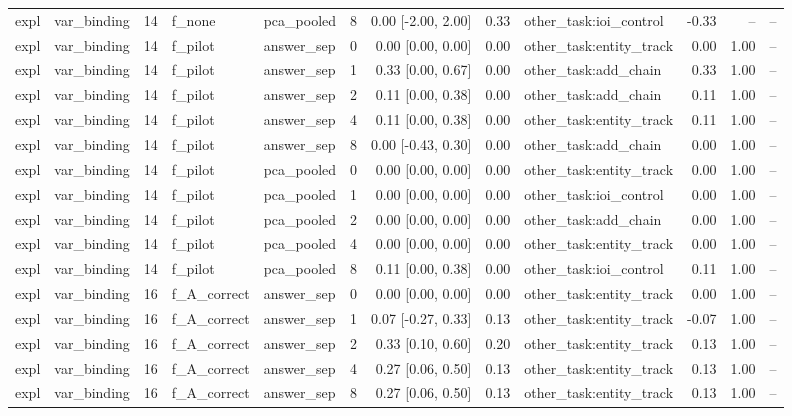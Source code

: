 \begin{tabular}{llrllrrrlrrr}
expl & var\_binding & 14 & f\_none & pca\_pooled & 8 & 0.00 [-2.00, 2.00] & 0.33 & other\_task:ioi\_control & -0.33 & -- & -- \\
expl & var\_binding & 14 & f\_pilot & answer\_sep & 0 & 0.00 [0.00, 0.00] & 0.00 & other\_task:entity\_track & 0.00 & 1.00 & -- \\
expl & var\_binding & 14 & f\_pilot & answer\_sep & 1 & 0.33 [0.00, 0.67] & 0.00 & other\_task:add\_chain & 0.33 & 1.00 & -- \\
expl & var\_binding & 14 & f\_pilot & answer\_sep & 2 & 0.11 [0.00, 0.38] & 0.00 & other\_task:add\_chain & 0.11 & 1.00 & -- \\
expl & var\_binding & 14 & f\_pilot & answer\_sep & 4 & 0.11 [0.00, 0.38] & 0.00 & other\_task:entity\_track & 0.11 & 1.00 & -- \\
expl & var\_binding & 14 & f\_pilot & answer\_sep & 8 & 0.00 [-0.43, 0.30] & 0.00 & other\_task:add\_chain & 0.00 & 1.00 & -- \\
expl & var\_binding & 14 & f\_pilot & pca\_pooled & 0 & 0.00 [0.00, 0.00] & 0.00 & other\_task:entity\_track & 0.00 & 1.00 & -- \\
expl & var\_binding & 14 & f\_pilot & pca\_pooled & 1 & 0.00 [0.00, 0.00] & 0.00 & other\_task:ioi\_control & 0.00 & 1.00 & -- \\
expl & var\_binding & 14 & f\_pilot & pca\_pooled & 2 & 0.00 [0.00, 0.00] & 0.00 & other\_task:add\_chain & 0.00 & 1.00 & -- \\
expl & var\_binding & 14 & f\_pilot & pca\_pooled & 4 & 0.00 [0.00, 0.00] & 0.00 & other\_task:entity\_track & 0.00 & 1.00 & -- \\
expl & var\_binding & 14 & f\_pilot & pca\_pooled & 8 & 0.11 [0.00, 0.38] & 0.00 & other\_task:ioi\_control & 0.11 & 1.00 & -- \\
expl & var\_binding & 16 & f\_A\_correct & answer\_sep & 0 & 0.00 [0.00, 0.00] & 0.00 & other\_task:entity\_track & 0.00 & 1.00 & -- \\
expl & var\_binding & 16 & f\_A\_correct & answer\_sep & 1 & 0.07 [-0.27, 0.33] & 0.13 & other\_task:entity\_track & -0.07 & 1.00 & -- \\
expl & var\_binding & 16 & f\_A\_correct & answer\_sep & 2 & 0.33 [0.10, 0.60] & 0.20 & other\_task:entity\_track & 0.13 & 1.00 & -- \\
expl & var\_binding & 16 & f\_A\_correct & answer\_sep & 4 & 0.27 [0.06, 0.50] & 0.13 & other\_task:entity\_track & 0.13 & 1.00 & -- \\
expl & var\_binding & 16 & f\_A\_correct & answer\_sep & 8 & 0.27 [0.06, 0.50] & 0.13 & other\_task:entity\_track & 0.13 & 1.00 & -- \\

\end{tabular}
